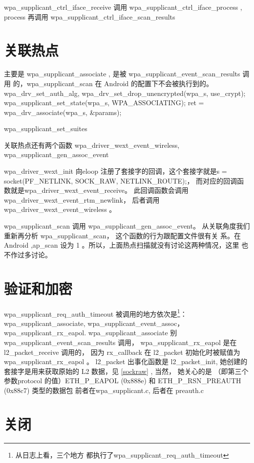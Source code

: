 \documentclass[a4paper,11pt,]{article}%
\begin{document}
wpa_supplicant_ctrl_iface_receive 调用 wpa_supplicant_ctrl_iface_process ,
process 再调用 wpa_supplicant_ctrl_iface_scan_results

\section{关联热点}
主要是 wpa_supplicant_associate , 是被 wpa_supplicant_event_scan_results 调用
的，wpa_supplicant_scan 在 Android 的配置下不会被执行到的。
        wpa_drv_set_auth_alg,
        wpa_drv_set_drop_unencrypted(wpa_s, use_crypt);
	wpa_supplicant_set_state(wpa_s, WPA_ASSOCIATING); 
	ret = wpa_drv_associate(wpa_s, \&params);



wpa_supplicant_set_suites

关联热点还有两个函数 wpa_driver_wext_event_wireless, wpa_supplicant_gen_assoc_event

wpa_driver_wext_init 向eloop 注册了套接字的回调，这个套接字就是s =
socket(PF_NETLINK, SOCK_RAW, NETLINK_ROUTE);，
而对应的回调函数就是wpa_driver_wext_event_receive。
此回调函数会调用 wpa_driver_wext_event_rtm_newlink， 后者调用
wpa_driver_wext_event_wireless 。

wpa_supplicant_scan 调用 wpa_supplicant_gen_assoc_event。
从关联角度我们重新再分析 wpa_supplicant_scan， 这个函数的行为跟配置文件很有关
系。在 Android ,ap_scan 设为 1 。所以，上面热点扫描就没有讨论这两种情况，这里
也不作过多讨论。

\section{验证和加密}
wpa_supplicant_req_auth_timeout  被调用的地方依次是\footnote{从日志上看，三个地方
都执行了wpa_supplicant_req_auth_timeout}：
wpa_supplicant_associate,
wpa_supplicant_event_assoc， 
wpa_supplicant_rx_eapol.
wpa_supplicant_associate 别 wpa_supplicant_event_scan_results 调用，
wpa_supplicant_rx_eapol 是在 l2_packet_receive 调用的， 因为 rx_callback 在
l2_packet 初始化时被赋值为wpa_supplicant_rx_eapol 。
l2_packet 出事化函数是 l2_packet_init, 她创建的套接字是用来获取原始的 L2 数据，见
\autoref{sockraw} ,
当然， 她关心的是 （即第三个参数protocol 的值）ETH_P_EAPOL (0x888e) 和 ETH_P_RSN_PREAUTH (0x88c7) 类型的数据包
   前者在wpa_supplicant.c, 后者在 preauth.c 


\section{关闭}
\end{document}
